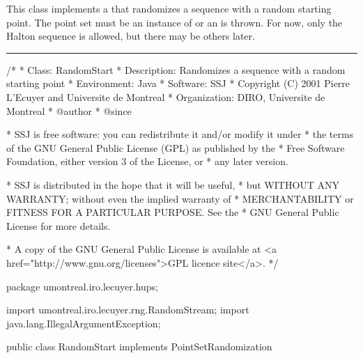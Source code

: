 
This class implements a
that randomizes a sequence with a random starting point.
The point set must be an instance of 
 or an
 is thrown.
For now, only the Halton sequence is allowed, but there may be others
later.

\bigskip\hrule\bigskip

\begin{code}
\begin{hide}
/*
 * Class:        RandomStart
 * Description:  Randomizes a sequence with a random starting point
 * Environment:  Java
 * Software:     SSJ 
 * Copyright (C) 2001  Pierre L'Ecuyer and Universite de Montreal
 * Organization: DIRO, Universite de Montreal
 * @author       
 * @since

 * SSJ is free software: you can redistribute it and/or modify it under
 * the terms of the GNU General Public License (GPL) as published by the
 * Free Software Foundation, either version 3 of the License, or
 * any later version.

 * SSJ is distributed in the hope that it will be useful,
 * but WITHOUT ANY WARRANTY; without even the implied warranty of
 * MERCHANTABILITY or FITNESS FOR A PARTICULAR PURPOSE.  See the
 * GNU General Public License for more details.

 * A copy of the GNU General Public License is available at
   <a href="http://www.gnu.org/licenses">GPL licence site</a>.
 */
\end{hide}
package umontreal.iro.lecuyer.hups;
\begin{hide}
 import umontreal.iro.lecuyer.rng.RandomStream;
 import java.lang.IllegalArgumentException;
\end{hide}

public class RandomStart implements PointSetRandomization \begin{hide} {

   protected RandomStream stream;
\end{hide}
\end{code}


